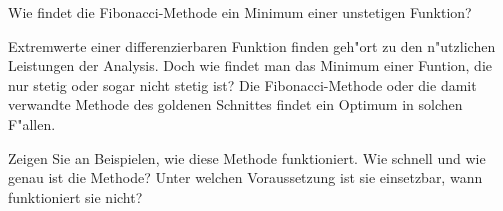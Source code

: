 \begin{aufgabe}
Wie findet die Fibonacci-Methode ein Minimum einer unstetigen Funktion?
\end{aufgabe}

{\parindent 0pt Extremwerte einer differenzierbaren Funktion finden geh"ort
zu den n"utzlichen Leistungen der Analysis.} Doch wie findet man das
Minimum einer Funtion, die nur stetig oder sogar nicht stetig ist?
Die Fibonacci-Methode oder die damit verwandte Methode des
goldenen Schnittes findet ein Optimum in solchen F"allen.

Zeigen Sie an Beispielen, wie diese Methode funktioniert. 
Wie schnell und wie genau ist die Methode?
Unter welchen Voraussetzung ist sie einsetzbar, wann
funktioniert sie nicht?
